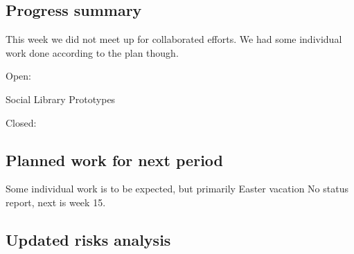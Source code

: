 \subsection{Progress summary}

This week we did not meet up for collaborated efforts. We had some individual work done according to the plan though.


Open:

Social Library
Prototypes

Closed:

\subsection{Planned work for next period}

Some individual work is to be expected, but primarily Easter vacation
No status report, next is week 15.

\subsection{Updated risks analysis}
